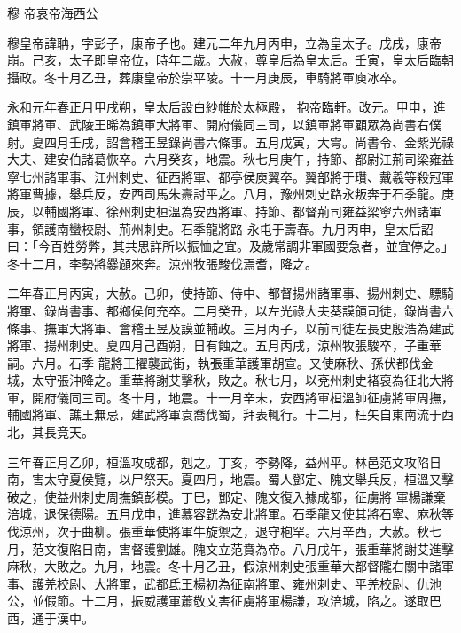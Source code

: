 
\begin{pinyinscope}

 穆
 帝哀帝海西公



 穆皇帝諱聃，字彭子，康帝子也。建元二年九月丙申，立為皇太子。戊戌，康帝崩。己亥，太子即皇帝位，時年二歲。大赦，尊皇后為皇太后。壬寅，皇太后臨朝攝政。冬十月乙丑，葬康皇帝於崇平陵。十一月庚辰，車騎將軍庾冰卒。



 永和元年春正月甲戌朔，皇太后設白紗帷於太極殿，
 抱帝臨軒。改元。甲申，進鎮軍將軍、武陵王晞為鎮軍大將軍、開府儀同三司，以鎮軍將軍顧眾為尚書右僕射。夏四月壬戌，詔會稽王昱錄尚書六條事。五月戊寅，大雩。尚書令、金紫光祿大夫、建安伯諸葛恢卒。六月癸亥，地震。秋七月庚午，持節、都尉江荊司梁雍益寧七州諸軍事、江州刺史、征西將軍、都亭侯庾翼卒。翼部將于瓚、戴羲等殺冠軍將軍曹據，舉兵反，安西司馬朱燾討平之。八月，豫州刺史路永叛奔于石季龍。庚辰，以輔國將軍、徐州刺史桓溫為安西將軍、持節、都督荊司雍益梁寧六州諸軍事，領護南蠻校尉、荊州刺史。石季龍將路
 永屯于壽春。九月丙申，皇太后詔曰：「今百姓勞弊，其共思詳所以振恤之宜。及歲常調非軍國要急者，並宜停之。」冬十二月，李勢將爨頠來奔。涼州牧張駿伐焉耆，降之。



 二年春正月丙寅，大赦。己卯，使持節、侍中、都督揚州諸軍事、揚州刺史、驃騎將軍、錄尚書事、都鄉侯何充卒。二月癸丑，以左光祿大夫葵謨領司徒，錄尚書六條事、撫軍大將軍、會稽王昱及謨並輔政。三月丙子，以前司徒左長史殷浩為建武將軍、揚州刺史。夏四月己酉朔，日有蝕之。五月丙戌，涼州牧張駿卒，子重華嗣。六月。石季
 龍將王擢襲武街，執張重華護軍胡宣。又使麻秋、孫伏都伐金城，太守張沖降之。重華將謝艾擊秋，敗之。秋七月，以兗州刺史褚裒為征北大將軍，開府儀同三司。冬十月，地震。十一月辛未，安西將軍桓溫帥征虜將軍周撫，輔國將軍、譙王無忌，建武將軍袁喬伐蜀，拜表輒行。十二月，枉矢自東南流于西北，其長竟天。



 三年春正月乙卯，桓溫攻成都，剋之。丁亥，李勢降，益州平。林邑范文攻陷日南，害太守夏侯覽，以尸祭天。夏四月，地震。蜀人鄧定、隗文舉兵反，桓溫又擊破之，使益州刺史周撫鎮彭模。丁巳，鄧定、隗文復入據成都，征虜將
 軍楊謙棄涪城，退保德陽。五月戊申，進慕容皝為安北將軍。石季龍又使其將石寧、麻秋等伐涼州，次于曲柳。張重華使將軍牛旋禦之，退守枹罕。六月辛酉，大赦。秋七月，范文復陷日南，害督護劉雄。隗文立范賁為帝。八月戊午，張重華將謝艾進擊麻秋，大敗之。九月，地震。冬十月乙丑，假涼州刺史張重華大都督隴右關中諸軍事、護羌校尉、大將軍，武都氐王楊初為征南將軍、雍州刺史、平羌校尉、仇池公，並假節。十二月，振威護軍蕭敬文害征虜將軍楊謙，攻涪城，陷之。遂取巴西，通于漢中。




\end{pinyinscope}
